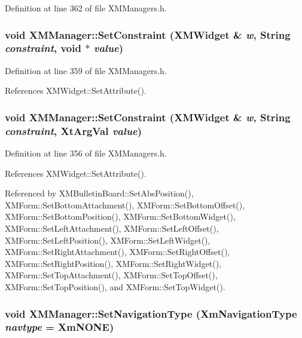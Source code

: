 Definition at line 362 of file XMManagers.h.
\subsubsection{\setlength{\rightskip}{0pt plus 5cm}void XMManager::Set\-Constraint ({\bf XMWidget} \& {\em w}, String {\em constraint}, void $\ast$ {\em value})\hspace{0.3cm}{\tt  [inline]}}\label{classXMManager_a10}




Definition at line 359 of file XMManagers.h.

References XMWidget::Set\-Attribute().
\subsubsection{\setlength{\rightskip}{0pt plus 5cm}void XMManager::Set\-Constraint ({\bf XMWidget} \& {\em w}, String {\em constraint}, Xt\-Arg\-Val {\em value})\hspace{0.3cm}{\tt  [inline]}}\label{classXMManager_a9}




Definition at line 356 of file XMManagers.h.

References XMWidget::Set\-Attribute().

Referenced by XMBulletin\-Board::Set\-Abs\-Position(), XMForm::Set\-Bottom\-Attachment(), XMForm::Set\-Bottom\-Offset(), XMForm::Set\-Bottom\-Position(), XMForm::Set\-Bottom\-Widget(), XMForm::Set\-Left\-Attachment(), XMForm::Set\-Left\-Offset(), XMForm::Set\-Left\-Position(), XMForm::Set\-Left\-Widget(), XMForm::Set\-Right\-Attachment(), XMForm::Set\-Right\-Offset(), XMForm::Set\-Right\-Position(), XMForm::Set\-Right\-Widget(), XMForm::Set\-Top\-Attachment(), XMForm::Set\-Top\-Offset(), XMForm::Set\-Top\-Position(), and XMForm::Set\-Top\-Widget().
\subsubsection{\setlength{\rightskip}{0pt plus 5cm}void XMManager::Set\-Navigation\-Type (Xm\-Navigation\-Type {\em navtype} = Xm\-NONE)\hspace{0.3cm}{\tt  [inline]}}\label{classXMManager_a6}




